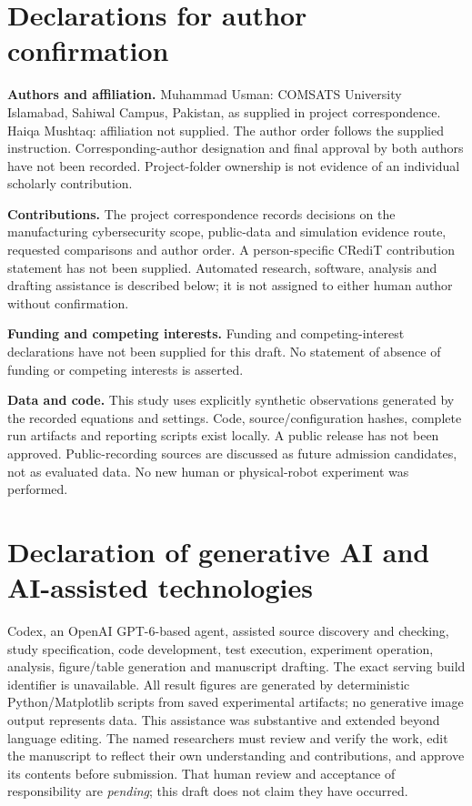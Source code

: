 \section*{Declarations for author confirmation}
\textbf{Authors and affiliation.} Muhammad Usman: COMSATS University Islamabad, Sahiwal Campus, Pakistan, as supplied in project correspondence. Haiqa Mushtaq: affiliation not supplied. The author order follows the supplied instruction. Corresponding-author designation and final approval by both authors have not been recorded. Project-folder ownership is not evidence of an individual scholarly contribution.

\textbf{Contributions.} The project correspondence records decisions on the manufacturing cybersecurity scope, public-data and simulation evidence route, requested comparisons and author order. A person-specific CRediT contribution statement has not been supplied. Automated research, software, analysis and drafting assistance is described below; it is not assigned to either human author without confirmation.

\textbf{Funding and competing interests.} Funding and competing-interest declarations have not been supplied for this draft. No statement of absence of funding or competing interests is asserted.

\textbf{Data and code.} This study uses explicitly synthetic observations generated by the recorded equations and settings. Code, source/configuration hashes, complete run artifacts and reporting scripts exist locally. A public release has not been approved. Public-recording sources are discussed as future admission candidates, not as evaluated data. No new human or physical-robot experiment was performed.

\section*{Declaration of generative AI and AI-assisted technologies}
Codex, an OpenAI GPT-6-based agent, assisted source discovery and checking, study specification, code development, test execution, experiment operation, analysis, figure/table generation and manuscript drafting. The exact serving build identifier is unavailable. All result figures are generated by deterministic Python/Matplotlib scripts from saved experimental artifacts; no generative image output represents data. This assistance was substantive and extended beyond language editing. The named researchers must review and verify the work, edit the manuscript to reflect their own understanding and contributions, and approve its contents before submission. That human review and acceptance of responsibility are \emph{pending}; this draft does not claim they have occurred.
